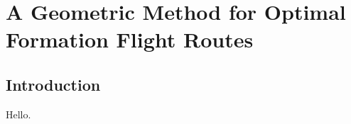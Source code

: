 \chapter{A Geometric Method for Optimal Formation Flight Routes}\label{chp:2}


\section{Introduction}

	Hello.
